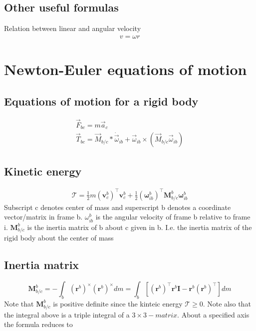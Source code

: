 \subsection{Other useful formulas}
Relation between linear and angular velocity
\begin{align}
    v = \omega r
\end{align}

\section{Newton-Euler equations of motion}
\subsection{Equations of motion for a rigid body}
\begin{align}
\Vec{F}_{bc} = m\Vec{a}_c \\
\Vec{T}_{bc} = \Vec{M}_{b/c}*\Dot{\Vec{\omega}}_{ib}+\Vec{\omega}_{ib}\times(\Vec{M}_{b/c}\Vec{\omega}_{ib})
\end{align}

\subsection{Kinetic energy}

\begin{align}
    \mathcal{T} = \frac{1}{2} m (\mathbf{v}_c^b)^\top \mathbf{v}_c^b +  \frac{1}{2} (\boldsymbol{\omega}_{ib}^b)^\top \mathbf{M}_{b/c}^b \boldsymbol{\omega}_{ib}^b
\end{align}
Subscript c denotes center of mass and superscript b denotes a coordinate vector/matrix in frame b. $\omega_{ib}^b$ is the angular velocity of frame b relative to frame i. $\mathbf{M}_{b/c}^b$ is the inertia matrix of b about c given in b. I.e. the inertia matrix of the rigid body about the center of mass

\subsection{Inertia matrix}
\begin{equation}
    \mathbf{M}_{b/c}^b = -\int_b (\mathbf{r}^b)^\times (\mathbf{r}^b)^\times dm = \int_b \left[ (\mathbf{r}^b)^\top \mathbf{r}^b \mathbf{I} - \mathbf{r}^b (\mathbf{r}^b)^\top \right] dm
\end{equation}
Note that $\mathbf{M}_{b/c}^b$ is positive definite since the kinteic energy $\mathcal{T}\geq0$. Note also that the integral above is a triple integral of a $3\times3-matrix$. About a specified axis the formula reduces to 

